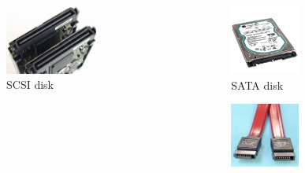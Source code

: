 \documentclass[croatian,t]{beamer} %
\begin{document}
    \begin{frame}
    	\begin{columns}[c]
    		\begin{column}{4cm}
    			\begin{figure}
					\includegraphics[width=0.62\textwidth]{../pics/scsi_disk.jpg}
					\caption{SCSI disk}
				\end{figure}
			\end{column}
			\begin{column}{4cm}
				\begin{figure}
					\includegraphics[width=0.62\textwidth]{../pics/sata_disk.jpg}
					\caption{SATA disk}
				\end{figure}
   				\begin{figure}
					\includegraphics[width=0.62\textwidth]{../pics/sata_connector.jpg}

\end{figure}
\end{column}
\end{columns}
\end{frame}
\end{document}
